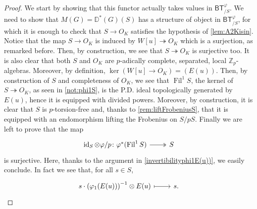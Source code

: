 \begin{proof}%
We start by showing that this functor actually takes values in $\mathsf{BT}^{\varphi}_{/S}$.
We need to show that $M(G) = \mathbb{D}^{*}(G)(S)$
has a structure of object in $\mathsf{BT}^{\varphi}_{/S}$, for which
it is enough to check that $S \to O_K$ satisfies
the hypothesis of \cref{lem:A2Kisin}.
Notice that the map $S \to O_K$ is induced by $W[u] \twoheadrightarrow O_K$
which is a surjection, as remarked before.
Then, by construction, we see that $S \twoheadrightarrow O_K$
is surjective too.
It is also clear that both $S$ and $O_K$ are 
$p$-adically complete, separated, local $\mathbb{Z}_{p}$-algebras.
Moreover, by definition, $\ker (W[u] \to O_K) = (E(u))$.
Then, by construction of $S$ and completeness of $O_K$,
we see that $\operatorname{Fil}^1 S$, the kernel of $S \twoheadrightarrow O_K$, 
as seen in \cref{not:phi1S}, is the P.D. ideal topologically generated by $E(u)$,
hence it is equipped with divided powers.
Moreover, by construction, it is clear that $S$ is $p$-torsion-free
and, thanks to \cref{rem:liftFrobeniusS},
that it is equipped with an endomorphism lifting the Frobenius on $S/pS$.
Finally we are left to prove that the map
\begin{equation*}
\begin{tikzcd}[row sep = 0ex
	,/tikz/column 1/.append style={anchor=base east}
	,/tikz/column 2/.append style={anchor=base west}]
	\id_{ S } \otimes \varphi/p \colon 
	\varphi^*(\operatorname{Fil}^1 S) \arrow[r, "", twoheadrightarrow] &
	S
\end{tikzcd}
\end{equation*} 
is surjective.
Here, thanks to the argument in \cref{invertibilityphi1E(u))}, we easily conclude.
In fact we see that, for all $s \in S$,
\begin{equation*}
\begin{tikzcd}[row sep = 0ex
	,/tikz/column 1/.append style={anchor=base east}
	,/tikz/column 2/.append style={anchor=base west}]
	s \cdot \left( \varphi_1(E(u)) \right)^{-1} \otimes E(u) 
	\arrow[r, "", mapsto] & 
	s
.\end{tikzcd}
\end{equation*} 




\end{proof}
